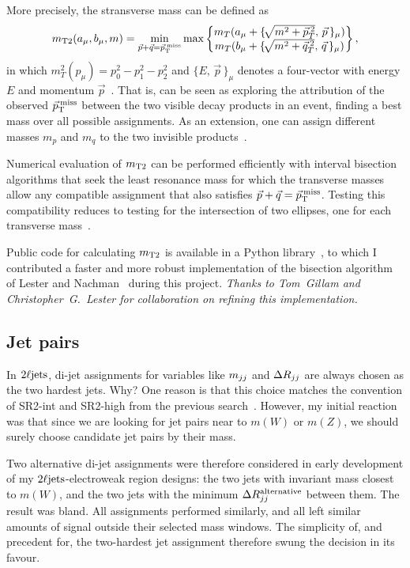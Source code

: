 More precisely, the stransverse mass can be defined as
\begin{equation}
m_\mathrm{T2}(a_\mu, b_\mu, m)
=
\min_{\vec p + \vec q=\vec p_\mathrm{T}^\mathrm{\:miss}}
\max
\begin{Bmatrix}
m_T(a_\mu + \{\!\sqrt{m^2 + \vec p_T^{\:2}},\,\vec p\,\}_\mu)\\
m_T(b_\mu + \{\!\sqrt{m^2 + \vec q_T^{\:2}},\,\vec q\,\}_\mu)\\
\end{Bmatrix}
,
\end{equation}
in which $m_T^2(p_\mu) = p_0^2 - p_1^2 - p_2^2$ and $\{E,\,\vec p\,\}_\mu$
denotes a four-vector with energy $E$ and momentum
$\vec p$~\cite{lester1999measuring}.
That is, can be seen as exploring the attribution of the observed $\vec p_\mathrm{T}^\mathrm{\:miss}$
between the two visible decay products in an event, finding a best mass over
all possible assignments.
As an extension, one can assign different masses $m_p$ and $m_q$ to
the two invisible products~\cite{lester2015bisection}.

Numerical evaluation of $m_\mathrm{T2}$ can be performed efficiently with interval
bisection algorithms that seek the least resonance mass for which the
transverse masses allow any compatible assignment that also satisfies
$\vec p + \vec q = \vec p_\mathrm{T}^\mathrm{\:miss}$.
Testing this compatibility reduces to testing for the intersection of two
ellipses, one for each transverse
mass~\cite{cheng2008minimal, lester2015bisection}.

Public code for calculating $m_\mathrm{T2}$ is available in a Python
library~\cite{gillam2021mt2}, to which I contributed a faster and more robust
implementation of the bisection algorithm of
Lester and Nachman~\cite{lester2015bisection} during this project.
\emph{Thanks to Tom~Gillam and Christopher~G.~Lester for collaboration on
refining this implementation.}


\subsection{Jet pairs}
In $2\ell\mathrm{jets}$, di-jet assignments for variables like $m_{jj}$ and $\Delta R_{jj}$ are
always chosen as the two hardest jets. Why?
One reason is that this choice matches the convention of SR2-int and SR2-high
from the previous search~\cite{atlas_23l_SUSY_2016_24}.
However, my initial reaction was that since we are looking for jet pairs near
to $m(W)$ or $m(Z)$, we should surely choose candidate jet pairs by their mass.

Two alternative di-jet assignments were therefore considered in early
development of my $2\ell\mathrm{jets}$-electroweak region designs:
the two jets with invariant mass closest to $m(W)$, and the two jets with the
minimum $\Delta R_{jj}^\mathrm{alternative}$ between them.
The result was bland.
All assignments performed similarly, and all left similar amounts of signal
outside their selected mass windows.
The simplicity of, and precedent for, the two-hardest jet assignment therefore
swung the decision in its favour.

